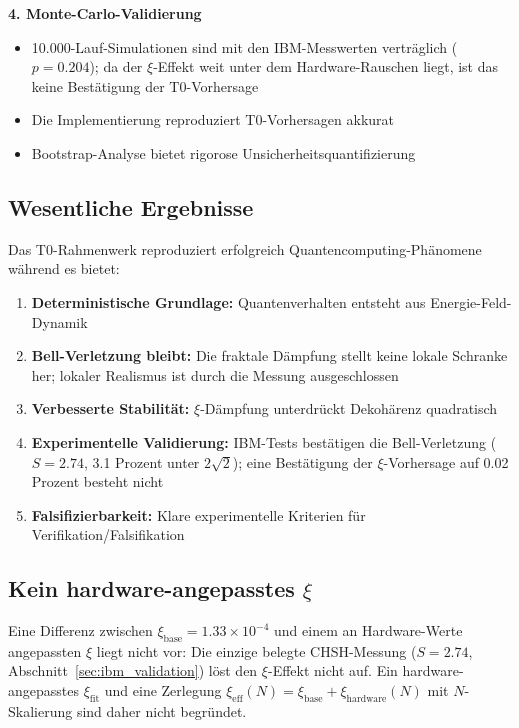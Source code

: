 \textbf{4. Monte-Carlo-Validierung}
\begin{itemize}
	\item 10.000-Lauf-Simulationen sind mit den IBM-Messwerten verträglich ($p = 0.204$); da der $\xi$-Effekt weit unter dem Hardware-Rauschen liegt, ist das keine Bestätigung der T0-Vorhersage
	\item Die Implementierung reproduziert T0-Vorhersagen akkurat
	\item Bootstrap-Analyse bietet rigorose Unsicherheitsquantifizierung
\end{itemize}

\subsection{Wesentliche Ergebnisse}

\begin{keyresult}
	Das T0-Rahmenwerk reproduziert erfolgreich Quantencomputing-Phänomene während es bietet:
	\begin{enumerate}
		\item \textbf{Deterministische Grundlage:} Quantenverhalten entsteht aus Energie-Feld-Dynamik
		\item \textbf{Bell-Verletzung bleibt:} Die fraktale Dämpfung stellt keine lokale Schranke her; lokaler Realismus ist durch die Messung ausgeschlossen
		\item \textbf{Verbesserte Stabilität:} $\xi$-Dämpfung unterdrückt Dekohärenz quadratisch
		\item \textbf{Experimentelle Validierung:} IBM-Tests bestätigen die Bell-Verletzung ($S = 2.74$, 3.1 Prozent unter $2\sqrt{2}$); eine Bestätigung der $\xi$-Vorhersage auf 0.02 Prozent besteht nicht
		\item \textbf{Falsifizierbarkeit:} Klare experimentelle Kriterien für Verifikation/Falsifikation
	\end{enumerate}
\end{keyresult}

\subsection{Kein hardware-angepasstes $\xi$}

Eine Differenz zwischen $\xi_{\text{base}} = 1.33 \times 10^{-4}$ und einem an Hardware-Werte angepassten $\xi$ liegt nicht vor: Die einzige belegte CHSH-Messung ($S = 2.74$, Abschnitt~\ref{sec:ibm_validation}) löst den $\xi$-Effekt nicht auf. Ein hardware-angepasstes $\xi_{\text{fit}}$ und eine Zerlegung $\xi_{\text{eff}}(N) = \xi_{\text{base}} + \xi_{\text{hardware}}(N)$ mit $N$-Skalierung sind daher nicht begründet.

